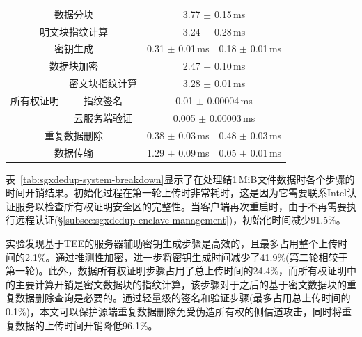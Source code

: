 \begin{table}[!htb]
\begin{tabular}{cccc}
        \multicolumn{2}{c}{数据分块}                & 
        \multicolumn{2}{c}{3.77 $\pm$ 0.15\,ms }                                                                                                                      \\  
        \multicolumn{2}{c}{明文块指纹计算}
                                                    & 
        \multicolumn{2}{c}{3.24 $\pm$ 0.28\,ms}                                                                                                                       \\ 
        \multicolumn{2}{c}{密钥生成}                & 
        0.31 $\pm$ 0.01\,ms                         & 0.18
        $\pm$ 0.01\,ms                                                                                                                                                \\ 
        \multicolumn{2}{c}{数据块加密}              & 
        \multicolumn{2}{c}{2.47 $\pm$ 0.10\,ms }                                                                                                                      \\ 
        \multirow{3}{*}{所有权证明}                 & 密文块指纹计算                                                   & \multicolumn{2}{c}{3.28 $\pm$ 0.01\,ms }     \\ 
                                                    & 指纹签名                                                         & \multicolumn{2}{c}{0.01 $\pm$ 0.00004\,ms }  \\ 
                                                    & 云服务端验证                                                     & \multicolumn{2}{c}{0.005 $\pm$ 0.00003\,ms } \\ 
        \multicolumn{2}{c}{重复数据删除}            & \multicolumn{1}{c}{0.38 $\pm$ 0.03\,ms }                         & 0.48 $\pm$ 0.03\,ms                          \\ 
        \multicolumn{2}{c}{数据传输}                & \multicolumn{1}{c}{1.29 $\pm$ 0.09\,ms }                         & 0.05 $\pm$ 0.01\,ms                          \\ \bottomrule
    \end{tabular}
\end{table}

表~\ref{tab:sgxdedup-system-breakdown}显示了在处理结1\,MiB文件数据时各个步骤的时间开销结果。初始化过程在第一轮上传时非常耗时，这是因为它需要联系Intel认证服务以检查所有权证明安全区的完整性。当客户端再次重启时，由于不再需要执行远程认证(\S\ref{subsec:sgxdedup-enclave-management})，初始化时间减少91.5\%。

实验发现基于TEE的服务器辅助密钥生成步骤是高效的，且最多占用整个上传时间的2.1\%。通过推测性加密，\sysnameS 进一步将密钥生成时间减少了41.9\%(第二轮相较于第一轮)。此外，数据所有权证明步骤占用了总上传时间的24.4\%，而所有权证明中的主要计算开销是密文数据块的指纹计算，该步骤对于之后的基于密文数据块的重复数据删除查询是必要的。通过轻量级的签名和验证步骤(最多占用总上传时间的0.1\%)，本文可以保护源端重复数据删除免受伪造所有权的侧信道攻击，同时将重复数据的上传时间开销降低96.1\%。

